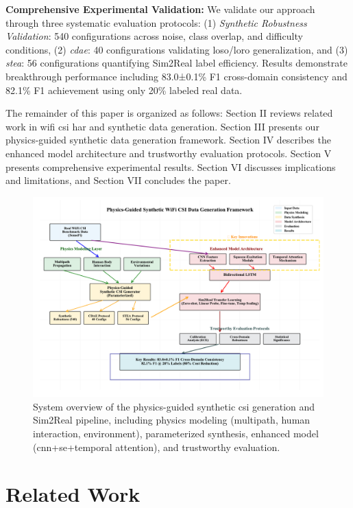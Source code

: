 \documentclass[journal]{IEEEtran}
\begin{document}
\textbf{Comprehensive Experimental Validation:} We validate our approach through three systematic evaluation protocols: (1) \textit{Synthetic Robustness Validation}: 540 configurations across noise, class overlap, and difficulty conditions, (2) \textit{\gls{cdae}}: 40 configurations validating \gls{loso}/\gls{loro} generalization, and (3) \textit{\gls{stea}}: 56 configurations quantifying Sim2Real label efficiency. Results demonstrate breakthrough performance including 83.0±0.1\% F1 cross-domain consistency and 82.1\% F1 achievement using only 20\% labeled real data.

The remainder of this paper is organized as follows: Section II reviews related work in \gls{wifi} \gls{csi} \gls{har} and synthetic data generation. Section III presents our physics-guided synthetic data generation framework. Section IV describes the enhanced model architecture and trustworthy evaluation protocols. Section V presents comprehensive experimental results. Section VI discusses implications and limitations, and Section VII concludes the paper.

\begin{figure}[t]
\centering
\includegraphics[width=\columnwidth]{figures/figure1_system overview.pdf}
\caption{System overview of the physics-guided synthetic \gls{csi} generation and Sim2Real pipeline, including physics modeling (multipath, human interaction, environment), parameterized synthesis, enhanced model (\gls{cnn}+\gls{se}+temporal attention), and trustworthy evaluation.}
\label{fig:system_overview}
\end{figure}

\section{Related Work}
\end{document}
